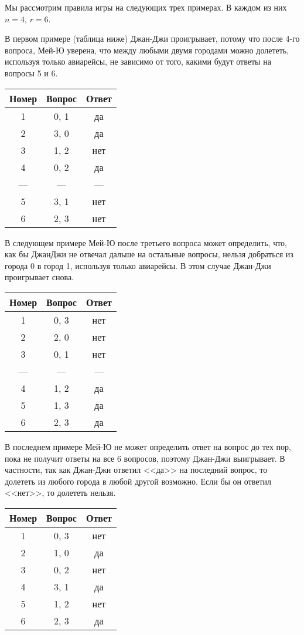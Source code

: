 Мы рассмотрим правила игры на следующих трех примерах. В каждом из них $n = 4$, $r = 6$.

В первом примере (таблица ниже) Джан-Джи проигрывает, потому что после 4-го вопроса,
Мей-Ю уверена, что между любыми двумя городами можно долететь, используя только
авиарейсы, не зависимо от того, какими будут ответы на вопросы 5 и 6.

\begin{center}
\renewcommand{\arraystretch}{1.5}
\begin{tabular}{|c|c|c|}
\hline
Номер & Вопрос & Ответ \\
\hline
1 &  0, 1 & да\\
\hline
2 &  3, 0 & да\\
\hline
3 &  1, 2 & нет\\
\hline
4 &  0, 2 & да\\
\hline
--- &  --- & ---\\
\hline
5 &  3, 1 & нет\\
\hline
6 &  2, 3 & нет\\
\hline
\end{tabular}
\end{center}


В следующем примере Мей-Ю после третьего вопроса может определить, что, как бы ДжанДжи не отвечал дальше на остальные вопросы, нельзя добраться из города 0 в город 1,
используя только авиарейсы. В этом случае Джан-Джи проигрывает снова.

\begin{center}
\renewcommand{\arraystretch}{1.5}
\begin{tabular}{|c|c|c|}
\hline
Номер & Вопрос & Ответ \\
\hline
1 &  0, 3 & нет\\
\hline
2 &  2, 0 & нет\\
\hline
3 &  0, 1 & нет\\
\hline
--- &  --- & ---\\
\hline
4 &  1, 2 & да\\
\hline
5 &  1, 3 & да\\
\hline
6 &  2, 3 & да\\
\hline
\end{tabular}
\end{center}

В последнем примере Мей-Ю не может определить ответ на вопрос до тех пор, пока не
получит ответы на все 6 вопросов, поэтому Джан-Джи выигрывает. В частности, так как
Джан-Джи ответил <<да>> на последний вопрос, то долететь из любого города в любой другой
возможно. Если бы он ответил <<нет>>, то долететь нельзя.

\begin{center}
\renewcommand{\arraystretch}{1.5}
\begin{tabular}{|c|c|c|}
\hline
Номер & Вопрос & Ответ \\
\hline
1 &  0, 3 & нет\\
\hline
2 &  1, 0 & да\\
\hline
3 &  0, 2 & нет\\
\hline
4 &  3, 1 & да\\
\hline
5 &  1, 2 & нет\\
\hline
6 &  2, 3 & да\\
\hline
\end{tabular}
\end{center}
